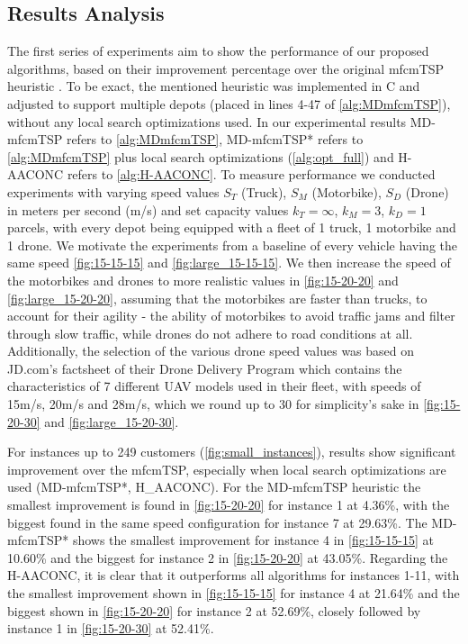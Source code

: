 \documentclass{article}
\begin{document}
	\subsection{Results Analysis}
	The first series of experiments aim to show the performance of our proposed algorithms, based on their improvement percentage over the original mfcmTSP heuristic \cite{Oikonomou2021}. To be exact, the mentioned heuristic was implemented in C and adjusted to support multiple depots (placed in lines 4-47 of \autoref{alg:MDmfcmTSP}), without any local search optimizations used. In our experimental results MD-mfcmTSP refers to \autoref{alg:MDmfcmTSP}, MD-mfcmTSP* refers to \autoref{alg:MDmfcmTSP} plus local search optimizations (\autoref{alg:opt_full}) and H-AACONC refers to \autoref{alg:H-AACONC}. To measure performance we conducted experiments with varying speed values $S_T$ (Truck), $S_M$ (Motorbike), $S_D$ (Drone) in meters per second (m/s) and set capacity values $k_T=\infty$, $k_M=3$, $k_D=1$ parcels, with every depot being equipped with a fleet of 1 truck, 1 motorbike and 1 drone. We motivate the experiments from a baseline of every vehicle having the same speed \autoref{fig:15-15-15} and \autoref{fig:large_15-15-15}. 
	We then increase the speed of the motorbikes and drones to more realistic values in \autoref{fig:15-20-20} and \autoref{fig:large_15-20-20}, assuming that the motorbikes are faster than trucks, to account for their agility - the ability of motorbikes to avoid traffic jams and filter through slow traffic, while drones do not adhere to road conditions at all. Additionally, the selection of the various drone speed values was based on JD.com's factsheet of their Drone Delivery Program \autocite{JDcom} which contains the characteristics of 7 different UAV models used in their fleet, with speeds of 15m/s, 20m/s and 28m/s, which we round up to 30 for simplicity's sake in \autoref{fig:15-20-30} and \autoref{fig:large_15-20-30}.
	\par 
	For instances up to 249 customers (\ref{fig:small_instances}), results show significant improvement over the mfcmTSP, especially when local search optimizations are used (MD-mfcmTSP*, H\_AACONC). For the MD-mfcmTSP heuristic the smallest improvement is found in \autoref{fig:15-20-20} for instance 1 at 4.36\%, with the biggest found in the same speed configuration for instance 7 at 29.63\%. The MD-mfcmTSP* shows the smallest improvement for instance 4 in \autoref{fig:15-15-15} at 10.60\% and the biggest for instance 2 in \autoref{fig:15-20-20} at 43.05\%. Regarding the H-AACONC, it is clear that it outperforms all algorithms for instances 1-11, with the smallest improvement shown in \autoref{fig:15-15-15} for instance 4 at 21.64\% and the biggest shown in \autoref{fig:15-20-20} for instance 2 at 52.69\%, closely followed by instance 1 in \autoref{fig:15-20-30} at 52.41\%.
\end{document}
